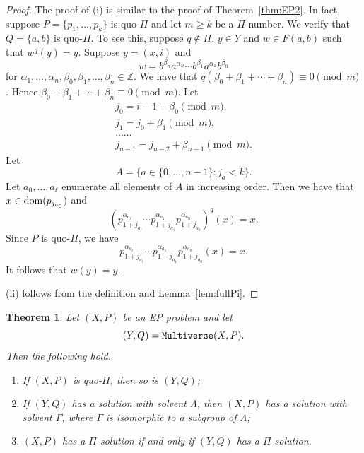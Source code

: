 \documentclass[11pt]{amsart}
\newtheorem{theorem}{Theorem}[section]
\theoremstyle{definition}
\newcommand{\dom}{{\mbox{\rm dom}}}
\theoremstyle{definition}
\numberwithin{equation}{section}
\begin{document}
\begin{proof} The proof of (i) is similar to the proof of Theorem~\ref{thm:EP2}. In fact, suppose $P=\{p_1, \dots, p_k\}$ is quo-$\Pi$ and let $m\geq k$ be a $\Pi$-number. We verify that $Q=\{a, b\}$ is quo-$\Pi$. To see this, suppose $q\not\in \Pi$, $y\in Y$ and $w\in F(a,b)$ such that $w^q(y)=y$. Suppose $y=(x,i)$ and 
$$ w=b^{\beta_n}a^{\alpha_n}\cdots b^{\beta_1}a^{\alpha_1}b^{\beta_0} $$
for $\alpha_1,\dots, \alpha_n, \beta_0, \beta_1,\dots, \beta_n\in \mathbb{Z}$. We have that $q(\beta_0+\beta_1+\cdots+\beta_n)\equiv 0\pmod m$. Hence $\beta_0+\beta_1+\cdots+\beta_n\equiv 0\pmod{m}$.  Let 
$$\begin{array}{l} j_0=i-1+\beta_0\pmod{m},\\  j_1=j_0+\beta_1\pmod{m}, \\
\dots\dots\\  j_{n-1}=j_{n-2}+\beta_{n-1}\pmod{m}. 
\end{array}$$ 
Let 
$$ A=\big\{a\in\{0,\dots,n-1\}\colon j_a<k\big\}. $$
Let $a_0, \dots, a_{\ell}$ enumerate all elements of $A$ in increasing order. Then we have that $x\in \dom(p_{j_{a_0}})$ and
$$ (p_{1+j_{a_\ell}}^{\alpha_{a_\ell}}\cdots p_{1+j_{a_1}}^{\alpha_{a_1}}p_{1+j_{a_0}}^{\alpha_{a_0}})^q(x)=x. $$
Since $P$ is quo-$\Pi$, we have
$$ p_{1+j_{a_\ell}}^{\alpha_{a_\ell}}\cdots p_{1+j_{a_1}}^{\alpha_{a_1}}p_{1+j_{a_0}}^{\alpha_{a_0}}(x)=x. $$
It follows that $w(y)=y$.

(ii) follows from the definition and Lemma~\ref{lem:fullPi}. 
\end{proof}

\begin{theorem}\label{thm:multiverse} Let $(X, P)$ be an EP problem and let 
$$(Y, Q)={\tt Multiverse}(X, P).$$ Then the following hold.
\begin{enumerate}
\item[\rm (i)] If $(X, P)$ is quo-$\Pi$, then so is $(Y, Q)$;
\item[\rm (ii)] If $(Y, Q)$ has a solution with solvent $\Lambda$, then $(X, P)$ has a solution with solvent $\Gamma$, where $\Gamma$ is isomorphic to a subgroup of $\Lambda$;
\item[\rm (iii)] $(X, P)$ has a $\Pi$-solution if and only if $(Y, Q)$ has a $\Pi$-solution.
\end{enumerate}
\end{theorem}
\end{document}
